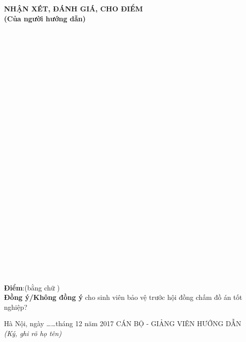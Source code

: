 \pagestyle{plain}

\begin{center}
    \textbf{NHẬN XÉT, ĐÁNH GIÁ, CHO ĐIỂM}\\
    \textbf{(Của người hướng dẫn)} \\[2cm]
    


    \dotfill \\
    \dotfill \\
    \dotfill \\
    \dotfill \\
    \dotfill \\
    \dotfill \\
    \dotfill \\
    \dotfill \\
    \dotfill \\
    \dotfill \\
    \dotfill \\
    \dotfill \\
    \dotfill \\
    \dotfill \\
    \dotfill \\
    \dotfill \\
    \dotfill \\
    \dotfill \\
    \dotfill \\
    \dotfill \\
    \dotfill \\
    \dotfill \\
    \dotfill \\
    \dotfill \\
    \dotfill \\
    \dotfill \\
\end{center}
\textbf{Điểm}:\dotfill  (bằng chữ \dotfill \dotfill) \\
    
\textbf{Đồng ý/Không đồng ý} cho sinh viên bảo vệ trước hội đồng chấm đồ án tốt nghiệp?\\
\begin{flushright}
    \begin{minipage}{0.5\textwidth}
    \centering
     Hà Nội, ngày \dots \dots  tháng 12 năm 2017\n
    CÁN BỘ - GIẢNG VIÊN HƯỚNG DẪN\n
    \textit{(Ký, ghi rõ họ tên)}
    \vspace{2cm}
    
    
    \end{minipage}
\end{flushright}